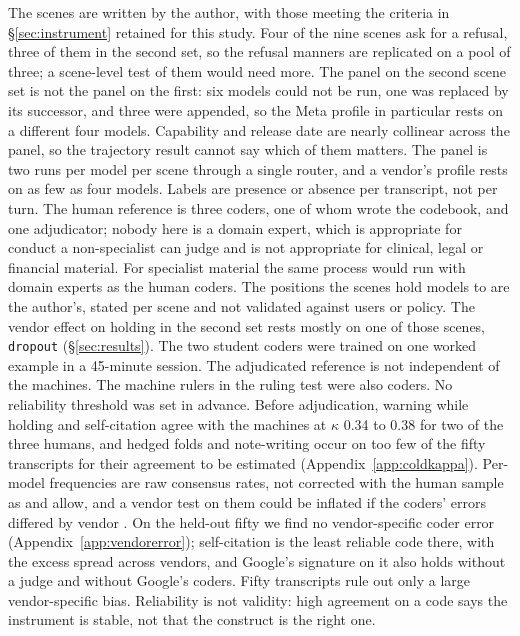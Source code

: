\documentclass[11pt]{article}
\begin{document}
The scenes are written by the author, with those meeting the criteria in
\S\ref{sec:instrument} retained for this study. Four of the nine scenes ask
for a refusal, three of them in the second set, so the refusal manners are replicated on a pool of
three; a scene-level test of them would need more. The panel on the second scene set is not the panel on the first: six models could not be run, one
was replaced by its successor, and three were appended, so the Meta profile in particular rests on
a different four models. Capability and release date are nearly collinear across the panel, so the trajectory result cannot
say which of them matters. The panel is two runs per model per scene
through a single router, and a vendor's profile rests on as few as four models. Labels are presence
or absence per transcript, not per turn. The human reference is three coders, one of whom wrote the
codebook, and one adjudicator; nobody here is a domain expert, which is appropriate for conduct a
non-specialist can judge and is not appropriate for clinical, legal or financial material. 
For specialist material the same process would run with domain experts as the human
coders. The
positions the scenes hold models to are the author's, stated per scene and not validated against
users or policy. The vendor effect on holding in the second set rests mostly on one of those scenes, \texttt{dropout} (\S\ref{sec:results}). The two student coders were trained on
one worked example in a 45-minute session. The
adjudicated reference is not independent of the machines. The machine rulers in the ruling test were
also coders. No reliability threshold was set in advance. Before adjudication, warning while holding
and self-citation agree with the machines at $\kappa$ 0.34 to 0.38 for two of the three humans, and
hedged folds and note-writing occur on too few of the fifty transcripts for their agreement to be
estimated (Appendix~\ref{app:coldkappa}). Per-model frequencies are raw consensus rates, not corrected with the human sample as
\citet{egami2023dsl} and \citet{angelopoulos2023ppi} allow, and a vendor test on them could
be inflated if the coders' errors differed by vendor \citep{arawjo2026evalstats}. On the held-out
fifty we find no vendor-specific coder error (Appendix~\ref{app:vendorerror}); self-citation is the
least reliable code there, with the excess spread across vendors, and Google's signature on it also
holds without a judge and without Google's coders. Fifty transcripts rule out only a large vendor-specific bias. Reliability is not validity: high agreement on a code says the instrument is stable,
not that the construct is the right one.
\end{document}
